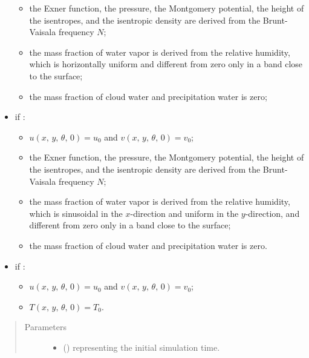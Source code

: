 \documentclass[letterpaper,10pt,english]{sphinxmanual}
\begin{document}
\begin{fulllineitems}
\begin{fulllineitems}
\begin{itemize}
\begin{itemize}
\item {} 
the Exner function, the pressure, the Montgomery potential, the height of the isentropes,                             and the isentropic density are derived from the Brunt-Vaisala frequency \(N\);

\item {} 
the mass fraction of water vapor is derived from the relative humidity, which is horizontally uniform                                 and different from zero only in a band close to the surface;

\item {} 
the mass fraction of cloud water and precipitation water is zero;

\end{itemize}

\item {} 
if :
\begin{itemize}
\item {} 
\(u(x, \, y, \, \theta, \, 0) = u_0\) and \(v(x, \, y, \, \theta, \, 0) = v_0\);

\item {} 
the Exner function, the pressure, the Montgomery potential, the height of the isentropes,                             and the isentropic density are derived from the Brunt-Vaisala frequency \(N\);

\item {} 
the mass fraction of water vapor is derived from the relative humidity, which is sinusoidal in the                            \(x\)-direction and uniform in the \(y\)-direction, and different from zero only in a band                              close to the surface;

\item {} 
the mass fraction of cloud water and precipitation water is zero.

\end{itemize}

\item {} 
if :
\begin{itemize}
\item {} 
\(u(x, \, y, \, \theta, \, 0) = u_0\) and \(v(x, \, y, \, \theta, \, 0) = v_0\);

\item {} 
\(T(x, \, y, \, \theta, \, 0) = T_0\).

\end{itemize}

\end{itemize}
\begin{quote}\begin{description}
\item[{Parameters}] \leavevmode\begin{itemize}
\item {} 
 () \textendash{}  representing the initial simulation time.


\end{itemize}
\end{description}
\end{quote}
\end{fulllineitems}
\end{fulllineitems}
\end{document}
